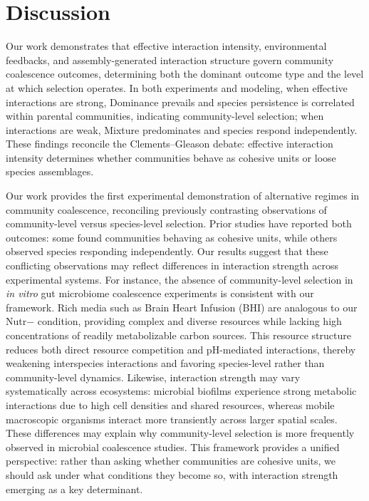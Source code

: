 \section{Discussion}
\label{sec:discussion}


Our work demonstrates that effective interaction intensity, environmental feedbacks, and assembly-generated interaction structure govern community coalescence outcomes, determining both the dominant outcome type and the level at which selection operates. In both experiments and modeling, when effective interactions are strong, Dominance prevails and species persistence is correlated within parental communities, indicating community-level selection; when interactions are weak, Mixture predominates and species respond independently.  These findings reconcile the Clements--Gleason debate: effective interaction intensity determines whether communities behave as cohesive units or loose species assemblages.

Our work provides the first experimental demonstration of alternative regimes in community coalescence, reconciling previously contrasting observations of community-level versus species-level selection. Prior studies have reported both outcomes: some found communities behaving as cohesive units\citep{Tikhonov2016, DiazColunga2022}, while others observed species responding independently\citep{VanderGucht2007, Vermeij1991}. Our results suggest that these conflicting observations may reflect differences in interaction strength across experimental systems. For instance, the absence of community-level selection in \textit{in vitro} gut microbiome coalescence experiments\citep{Goldman2025, Walton2025} is consistent with our framework. Rich media such as Brain Heart Infusion (BHI) are analogous to our Nutr$-$ condition, providing complex and diverse resources while lacking high concentrations of readily metabolizable carbon sources. This resource structure reduces both direct resource competition and pH-mediated interactions, thereby weakening interspecies interactions\citep{Ratzke2020} and favoring species-level rather than community-level dynamics. Likewise, interaction strength may vary systematically across ecosystems: microbial biofilms experience strong metabolic interactions due to high cell densities and shared resources\citep{Nadell2016}, whereas mobile macroscopic organisms interact more transiently across larger spatial scales. These differences may explain why community-level selection is more frequently observed in microbial coalescence studies. This framework provides a unified perspective: rather than asking whether communities are cohesive units, we should ask under what conditions they become so, with interaction strength emerging as a key determinant.


